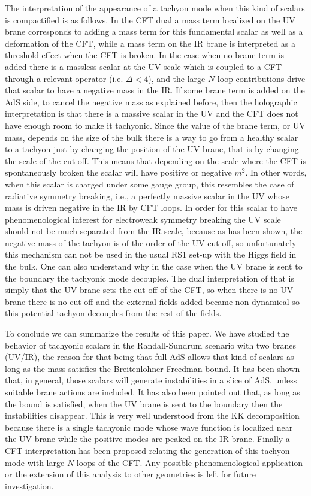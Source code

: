 \documentclass[a4paper,12pt,dvips]{article}
\begin{document}
The interpretation of the appearance of a tachyon mode when this
kind of scalars is compactified is as follows. In the CFT dual a
mass term localized on the UV brane corresponds to adding a mass
term for this fundamental scalar as well as a deformation of the
CFT, while a mass term on the IR brane is interpreted as a
threshold effect when the CFT is broken. In the case when no brane
term is added there is a massless scalar at the UV scale which is
coupled to a CFT through a relevant operator (i.e. $\Delta<4$),
and the large-$N$ loop contributions drive that scalar to have a
negative mass in the IR. If some brane term is added on the AdS
side, to cancel the negative mass as explained before, then the
holographic interpretation is that there is a massive scalar
in the UV and the CFT does not have enough room to make it
tachyonic. Since the value of the brane term, or UV mass, depends
on the size of the bulk there is a way to go from a healthy scalar
to a tachyon just by changing the position of the UV brane, that
is by changing the scale of the cut-off.
 This means that depending on the scale where the CFT is
spontaneously broken the scalar will have positive or negative
$m^2$. In other words, when this scalar is charged under some
gauge group, this resembles the case of radiative symmetry
breaking, i.e., a perfectly massive scalar in the UV whose mass
is driven negative in the IR by CFT loops. In order for this scalar
to have phenomenological interest for electroweak symmetry
breaking the UV scale should not be much separated from the IR
scale, because as has been shown, the negative mass of the tachyon
is of the order of the UV cut-off, so unfortunately this mechanism
can not be used in the usual RS1 set-up with the Higgs field in
the bulk. One can also understand why in the case when the UV
brane is sent to the boundary the tachyonic mode decouples. The
dual interpretation of that is simply that the UV brane sets the
cut-off of the CFT, so when there is no UV brane there is no
cut-off and the external fields added became non-dynamical so this
potential tachyon decouples from the rest of the fields.

To conclude we can summarize the results of this paper. We have
studied the behavior of tachyonic scalars in the Randall-Sundrum
scenario with two branes (UV/IR), the reason for that being that
full AdS allows that kind of scalars as long as the mass satisfies
the Breitenlohner-Freedman bound. It has been shown that, in
general, those scalars will generate instabilities in a slice of
AdS, unless suitable brane actions are included. It has also been
pointed out that, as long as the bound is satisfied, when the UV
brane is sent to the boundary then the instabilities disappear.
This is very well understood from the KK decomposition because
there is a single tachyonic mode whose wave function is localized
near the UV brane while the positive modes are peaked on the IR
brane. Finally a CFT interpretation has been proposed relating the
generation of this tachyon mode with large-$N$ loops of the CFT.
Any possible phenomenological application or the extension of this
analysis to other geometries is left for future investigation.
\end{document}
